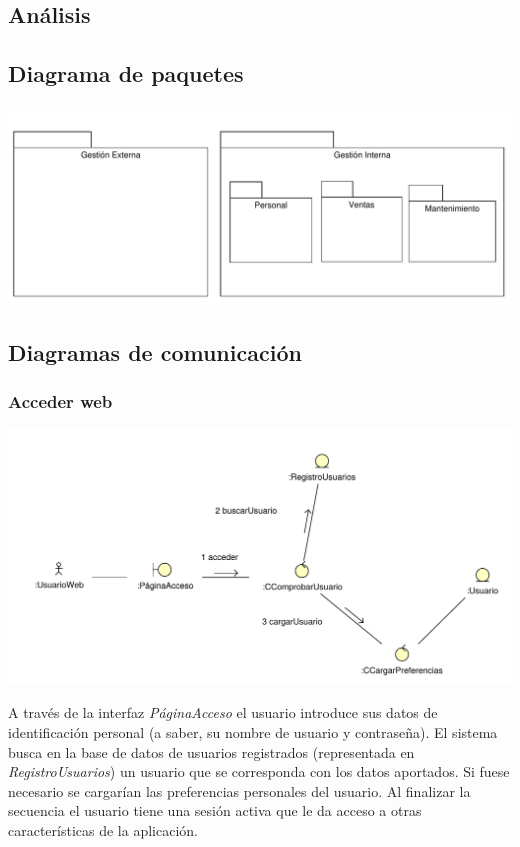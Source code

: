 \documentclass[11pt, a4paper, twoside, titlepage]{article}
\begin{document}
\begin{landscape}
	\section{Análisis}
		\subsection{Diagrama de paquetes}
		\vfill
		\begin{center}
			\hspace*{-.5cm}
			\includegraphics[scale=1]{analisis/diagramas/paquetes.pdf}
		\end{center}
		\vfill
\end{landscape}
		\subsection{Diagramas de comunicación}
			\subsubsection{Acceder web}
				\begin{center}
					\includegraphics[scale=.75]{analisis/diagramas/accederweb.pdf}
				\end{center}

				A través de la interfaz {\itshape PáginaAcceso} el usuario introduce sus datos de identificación personal (a saber, su nombre de usuario y contraseña). El sistema busca en la base de datos de usuarios registrados (representada en {\itshape RegistroUsuarios}) un usuario que se corresponda con los datos aportados. Si fuese necesario se cargarían las preferencias personales del usuario. Al finalizar la secuencia el usuario tiene una sesión activa que le da acceso a otras características de la aplicación.
\end{document}

